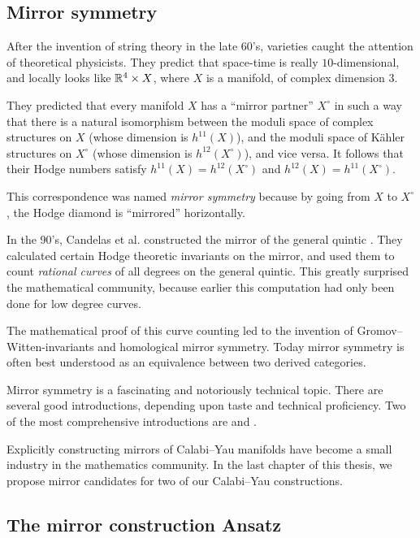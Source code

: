 \subsection{Mirror symmetry}

After the invention of string theory in the late 60's, \CY varieties caught the attention of theoretical physicists. They predict that space-time is really $10$-dimensional, and locally looks like $\mathbb{R}^4 \times X$, where $X$ is a \CY manifold, of complex dimension $3$.

They predicted that every \CY manifold $X$ has a ``mirror partner'' $X^\circ$ in such a way that there is a natural isomorphism between the moduli space of complex structures on $X$ (whose dimension is $h^{11}(X)$), and the moduli space of Kähler structures on $X^\circ$ (whose dimension is $h^{12}(X^\circ)$), and vice versa. It follows that their Hodge numbers satisfy $h^{11}(X) = h^{12}(X^\circ)$ and $h^{12}(X)=h^{11}(X^\circ)$.

This correspondence was named \emph{mirror symmetry} because by going from $X$ to $X^\circ$, the Hodge diamond is ``mirrored'' horizontally.

In the 90's, Candelas et al. constructed the mirror of the general quintic \cite{candelas_string}. They calculated certain Hodge theoretic invariants on the mirror, and used them to count \emph{rational curves} of all degrees on the general quintic. This greatly surprised the mathematical community, because earlier this computation had only been done for low degree curves.

The mathematical proof of this curve counting led to the invention of Gromov--Witten-invariants and homological mirror symmetry. Today mirror symmetry is often best understood as an equivalence between two derived categories.

Mirror symmetry is a fascinating and notoriously technical topic. There are several good introductions, depending upon taste and technical proficiency. Two of the most comprehensive introductions are \cite{mirrorsymmetry} and \cite{mirrorsymmetry_vafa}.

Explicitly constructing mirrors of Calabi--Yau manifolds have become a small industry in the mathematics community. In the last chapter of this thesis, we propose mirror candidates for two of our Calabi--Yau constructions. 

\subsection{The mirror construction Ansatz}
\label{sec:the_mirror_construction_ansatz}

